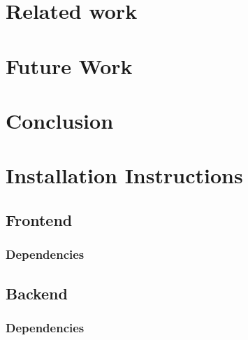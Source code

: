 \documentclass[11pt]{report}
\begin{document}
\chapter{Related work}
\chapter{Future Work}
\chapter{Conclusion}
\chapter{Installation Instructions}
\section {Frontend}
\subsection {Dependencies}
\section {Backend}
\subsection {Dependencies}
\end{document}
